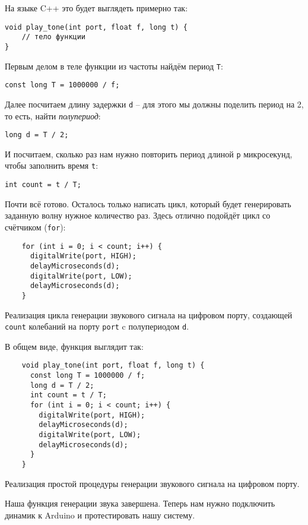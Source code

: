 \documentclass[../sparc.tex]{subfiles}
\begin{document}
На языке C++ это будет выглядеть примерно так:
\begin{verbatim}
void play_tone(int port, float f, long t) {
    // тело функции
}
\end{verbatim}

Первым делом в теле функции из частоты найдём период \texttt{T}:
\begin{verbatim}
const long T = 1000000 / f;
\end{verbatim}

Далее посчитаем длину задержки \texttt{d} -- для этого мы должны поделить период
на 2, то есть, найти \emph{полупериод}:
\begin{verbatim}
long d = T / 2;
\end{verbatim}

И посчитаем, сколько раз нам нужно повторить период длиной \texttt{p}
микросекунд, чтобы заполнить время \texttt{t}:
\begin{verbatim}
int count = t / T;
\end{verbatim}

Почти всё готово. Осталось только написать цикл, который будет генерировать
заданную волну нужное количество раз. Здесь отлично подойдёт цикл со счётчиком
(\texttt{for}):

\begin{listing}[H]
  \begin{verbatim}
    for (int i = 0; i < count; i++) {
      digitalWrite(port, HIGH);
      delayMicroseconds(d);
      digitalWrite(port, LOW);
      delayMicroseconds(d);
    }
  \end{verbatim}
  \label{listing:play-tone-cycle}
  \caption{Реализация цикла генерации звукового сигнала на цифровом порту,
    создающей \texttt{count} колебаний на порту \texttt{port} c полупериодом
    \texttt{d}.}
\end{listing}

В общем виде, функция выглядит так:

\begin{listing}[H]
  \begin{verbatim}
    void play_tone(int port, float f, long t) {
      const long T = 1000000 / f;
      long d = T / 2;
      int count = t / T;
      for (int i = 0; i < count; i++) {
        digitalWrite(port, HIGH);
        delayMicroseconds(d);
        digitalWrite(port, LOW);
        delayMicroseconds(d);
      }
    }
  \end{verbatim}
  \label{listing:play-tone-procedure}
  \caption{Реализация простой процедуры генерации звукового сигнала на цифровом
    порту.}
\end{listing}

Наша функция генерации звука завершена. Теперь нам нужно подключить динамик к
Arduino и протестировать нашу систему.

\end{document}
